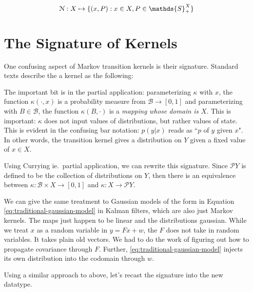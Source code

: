 \newcommand{\symmetric}{\mathds{S}}
\begin{equation}
    \gaussian : X \mapsto \{(x,P) : x\in X, P \in \symmetric^X_+\}
\end{equation}

\section{The Signature of Kernels}
\label{sec:kernel-signature}

One confusing aspect of Markov transition kernels is their signature. 
Standard texts describe the a kernel as the following:


The important bit is in the partial application: parameterizing $\kappa$ with $x$, the function $\kappa(\cdot, x)$ is a probability measure from $\mathcal{B} \rightarrow [0,1]$ and parameterizing with $B\in \mathcal{B}$, the function $\kappa(B,\cdot)$ is a \emph{mapping whose domain is $X$}.
This is important: $\kappa$ does not input values of distributions, but rather values of state.
This is evident in the confusing bar notation: $p(y|x)$ reads as ``$p$ of $y$ given $x$".
In other words, the transition kernel gives a distribution on $Y$ given a fixed value of $x\in X$.

\newcommand{\giry}{\mathcal{P}}
Using Currying ie.\ partial application, we can rewrite this signature. 
Since $\giry Y$ is defined to be the collection of distributions on $Y$, then there is an equivalence between $\kappa : \mathcal{B} \times X \rightarrow [0,1]$ and $\kappa : X \rightarrow \giry Y$.

We can give the same treatment to Gaussian models of the form in Equation \ref{eq:traditional-gaussian-model} in Kalman filters, which are also just Markov kernels. The maps just happen to be linear and the distributions gaussian.
While we treat $x$ as a random variable in $y = Fx + w$, the $F$ does not take in random variables.
It takes plain old vectors.
We had to do the work of figuring out how to propagate covariance through $F$.
Further, \ref{eq:traditional-gaussian-model} injects its own distribution into the codomain through $w$.


Using a similar approach to above, let's recast the signature into the new datatype.


